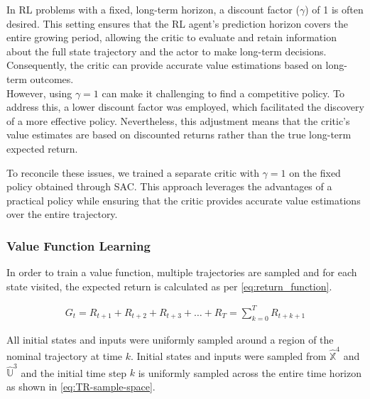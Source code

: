 In RL problems with a fixed, long-term horizon, a discount factor ($\gamma$)
of 1 is often desired. This setting ensures that the RL agent's prediction horizon covers the entire growing period, allowing the critic to evaluate and retain information about the full state trajectory and the actor to make long-term decisions. Consequently, the critic can provide accurate value estimations based on long-term outcomes.\\
However, using $\gamma = 1$ can make it challenging to find a competitive policy. To address this, a lower discount factor was employed, which facilitated the discovery of a more effective policy. Nevertheless, this adjustment means that the critic's value estimates are based on discounted returns rather than the true long-term expected return.

To reconcile these issues, we trained a separate critic with $\gamma = 1$ on the fixed policy obtained through SAC. This approach leverages the advantages of a practical policy while ensuring that the critic provides accurate value estimations over the entire trajectory.


\subsubsection{Value Function Learning}
In order to train a value function, multiple trajectories are sampled and for each state visited, the expected return is calculated as per \autoref{eq:return_function}. 

\begin{equation}
	\begin{aligned}
		G_t  = R_{t+1} + R_{t+2} + R_{t+3} + \dots + R_{T} = \sum_{k=0}^TR_{t+k+1}
	\end{aligned}
	\label{eq:return_function}
\end{equation}

All initial states and inputs were uniformly sampled around a region of the nominal trajectory at time $k$. Initial states and inputs were sampled from $\hat{\mathbb{X}}^4$ and $\hat{\mathbb{U}}^3$ and the initial time step $k$ is uniformly sampled across the entire time horizon as shown in \autoref{eq:TR-sample-space}.


